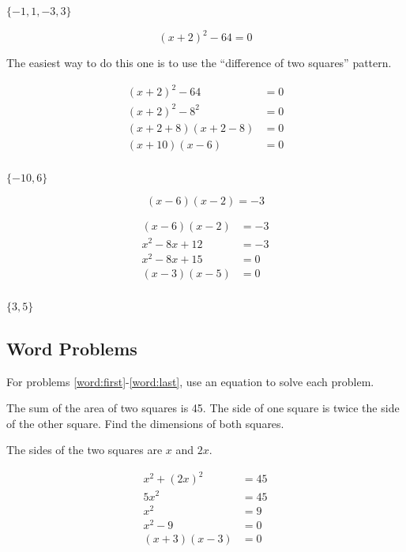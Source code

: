 \documentclass[fleqn,addpoints]{exam}
\begin{document}
\begin{questions}
\begin{solution}[5 cm]
$ \{-1, 1, -3, 3 \} $

\end{solution}

\question[5]
\label{solve:last}
\[ (x + 2)^2 - 64 = 0 \]
\begin{solution}[5 cm]

The easiest way to do this one is to use the ``difference of two squares'' pattern.


\begin{align*}
  (x + 2)^2 - 64 &= 0 \\
  (x + 2)^2 - 8^2 &= 0 \\
  (x + 2 + 8)(x + 2 - 8) &= 0 \\
  (x + 10)(x - 6) &= 0 \\
\end{align*}

$ \{-10, 6\} $

\end{solution}

\question[5]
\[ (x - 6)(x - 2) = -3 \]
\begin{solution}[5 cm]

\begin{align*}
  (x - 6)(x - 2) &= -3 \\
  x^2 - 8x + 12  &= -3 \\
  x^2 - 8x + 15  &= 0 \\
  (x - 3)(x - 5) &= 0 \\
\end{align*}

$ \{3, 5\} $

\end{solution}


\ifprintanswers
\else
\pagebreak
\fi

\subsection{Word Problems}

For problems \ref{word:first}-\ref{word:last}, use an equation to solve each problem.

\question[7]
\label{word:first}
The sum of the area of two squares is 45.  The side of one square is twice the side of the other square.  Find the
dimensions of both squares.
\begin{solution}[7 cm]

The sides of the two squares are $x$ and $2x$.

\begin{align*}
  x^2 + (2x)^2 &= 45 \\
  5x^2 &= 45 \\
  x^2 &= 9 \\
  x^2 - 9 &= 0 \\
  (x + 3)(x - 3) &= 0 \\
\end{align*}


\end{solution}
\end{questions}
\end{document}
